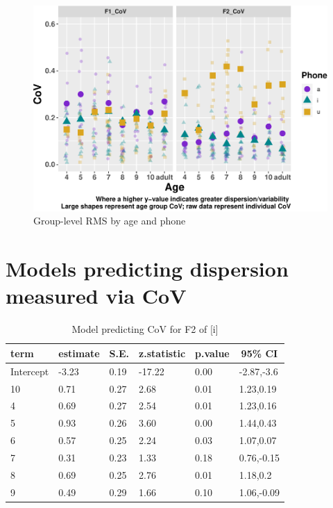 \documentclass[
]{article}
\begin{document}
\begin{figure}
\centering
\includegraphics{3_vtl_results_files/figure-latex/delta-disp-fig-1.pdf}
\caption{\label{fig:delta-disp-fig}Group-level RMS by age and phone}
\end{figure}

\hypertarget{models-predicting-dispersion-measured-via-cov}{%
\section{Models predicting dispersion measured via CoV}\label{models-predicting-dispersion-measured-via-cov}}

\begin{table}[tbp]

\begin{center}
\begin{threeparttable}

\caption{\label{tab:f2-i-model}Model predicting CoV for F2 of [i]}

\begin{tabular}{llllll}
\toprule
term & \multicolumn{1}{c}{estimate} & \multicolumn{1}{c}{S.E.} & \multicolumn{1}{c}{z.statistic} & \multicolumn{1}{c}{p.value} & \multicolumn{1}{c}{95\% CI}\\
\midrule
Intercept & -3.23 & 0.19 & -17.22 & 0.00 & -2.87,-3.6\\
10 & 0.71 & 0.27 & 2.68 & 0.01 & 1.23,0.19\\
4 & 0.69 & 0.27 & 2.54 & 0.01 & 1.23,0.16\\
5 & 0.93 & 0.26 & 3.60 & 0.00 & 1.44,0.43\\
6 & 0.57 & 0.25 & 2.24 & 0.03 & 1.07,0.07\\
7 & 0.31 & 0.23 & 1.33 & 0.18 & 0.76,-0.15\\
8 & 0.69 & 0.25 & 2.76 & 0.01 & 1.18,0.2\\
9 & 0.49 & 0.29 & 1.66 & 0.10 & 1.06,-0.09\\
\bottomrule
\end{tabular}

\end{threeparttable}
\end{center}

\end{table}
\end{document}

